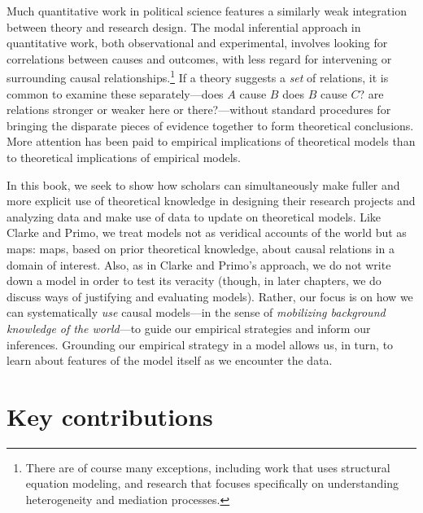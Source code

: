 \documentclass[
  12pt,
]{book}
\begin{document}
Much quantitative work in political science features a similarly weak integration between theory and research design. The modal inferential approach in quantitative work, both observational and experimental, involves looking for correlations between causes and outcomes, with less regard for intervening or surrounding causal relationships.\footnote{There are of course many exceptions, including work that uses structural equation modeling, and research that focuses specifically on understanding heterogeneity and mediation processes.} If a theory suggests a \emph{set} of relations, it is common to examine these separately---does \(A\) cause \(B\) does \(B\) cause \(C\)? are relations stronger or weaker here or there?---without standard procedures for bringing the disparate pieces of evidence together to form theoretical conclusions. More attention has been paid to empirical implications of theoretical models than to theoretical implications of empirical models.

In this book, we seek to show how scholars can simultaneously make fuller and more explicit use of theoretical knowledge in designing their research projects and analyzing data and make use of data to update on theoretical models. Like Clarke and Primo, we treat models not as veridical accounts of the world but as maps: maps, based on prior theoretical knowledge, about causal relations in a domain of interest. Also, as in Clarke and Primo's approach, we do not write down a model in order to test its veracity (though, in later chapters, we do discuss ways of justifying and evaluating models). Rather, our focus is on how we can systematically \emph{use} causal models---in the sense of \emph{mobilizing background knowledge of the world}---to guide our empirical strategies and inform our inferences. Grounding our empirical strategy in a model allows us, in turn, to learn about features of the model itself as we encounter the data.

\hypertarget{key-contributions}{%
\section{Key contributions}\label{key-contributions}}
\end{document}
